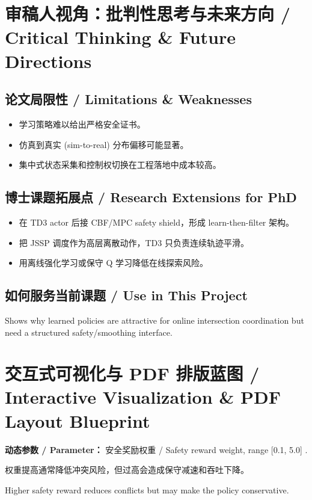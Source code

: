 \documentclass[UTF8,a4paper,11pt,fontset=fandol]{ctexart}
\begin{document}
\section{审稿人视角：批判性思考与未来方向 / Critical Thinking \& Future Directions}
\subsection{论文局限性 / Limitations \& Weaknesses}
\begin{itemize}
\item 学习策略难以给出严格安全证书。
\item 仿真到真实 (sim-to-real) 分布偏移可能显著。
\item 集中式状态采集和控制权切换在工程落地中成本较高。
\end{itemize}


\subsection{博士课题拓展点 / Research Extensions for PhD}
\begin{itemize}
\item 在 TD3 actor 后接 CBF/MPC safety shield，形成 learn-then-filter 架构。
\item 把 JSSP 调度作为高层离散动作，TD3 只负责连续轨迹平滑。
\item 用离线强化学习或保守 Q 学习降低在线探索风险。
\end{itemize}


\subsection{如何服务当前课题 / Use in This Project}
Shows why learned policies are attractive for online intersection coordination but need a structured safety/smoothing interface.

\section{交互式可视化与 PDF 排版蓝图 / Interactive Visualization \& PDF Layout Blueprint}
\textbf{动态参数 / Parameter：} 安全奖励权重 / Safety reward weight, range [0.1, 5.0] .

权重提高通常降低冲突风险，但过高会造成保守减速和吞吐下降。

Higher safety reward reduces conflicts but may make the policy conservative.
\end{document}
